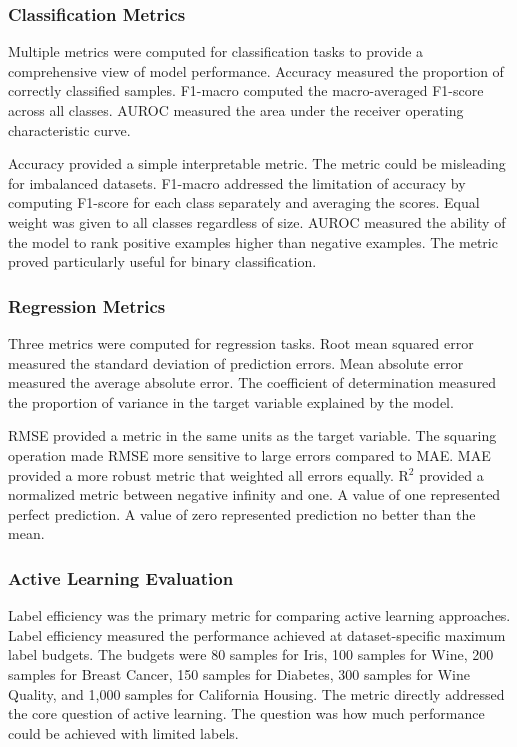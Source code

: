 \documentclass[conference]{IEEEtran}
\begin{document}
\subsubsection{Classification Metrics}

Multiple metrics were computed for classification tasks to provide a comprehensive view of model performance. Accuracy measured the proportion of correctly classified samples. F1-macro computed the macro-averaged F1-score across all classes. AUROC measured the area under the receiver operating characteristic curve.

Accuracy provided a simple interpretable metric. The metric could be misleading for imbalanced datasets. F1-macro addressed the limitation of accuracy by computing F1-score for each class separately and averaging the scores. Equal weight was given to all classes regardless of size. AUROC measured the ability of the model to rank positive examples higher than negative examples. The metric proved particularly useful for binary classification.

\subsubsection{Regression Metrics}

Three metrics were computed for regression tasks. Root mean squared error measured the standard deviation of prediction errors. Mean absolute error measured the average absolute error. The coefficient of determination measured the proportion of variance in the target variable explained by the model.

RMSE provided a metric in the same units as the target variable. The squaring operation made RMSE more sensitive to large errors compared to MAE. MAE provided a more robust metric that weighted all errors equally. R$^2$ provided a normalized metric between negative infinity and one. A value of one represented perfect prediction. A value of zero represented prediction no better than the mean.

\subsubsection{Active Learning Evaluation}

Label efficiency was the primary metric for comparing active learning approaches. Label efficiency measured the performance achieved at dataset-specific maximum label budgets. The budgets were 80 samples for Iris, 100 samples for Wine, 200 samples for Breast Cancer, 150 samples for Diabetes, 300 samples for Wine Quality, and 1,000 samples for California Housing. The metric directly addressed the core question of active learning. The question was how much performance could be achieved with limited labels.
\end{document}
